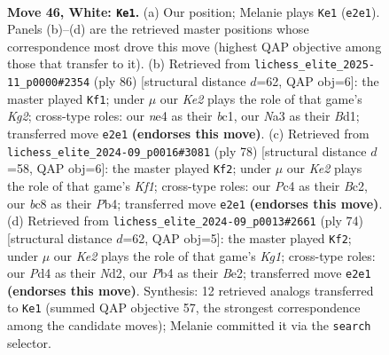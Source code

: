 \documentclass[11pt]{article}
\begin{document}
\clearpage

\begin{figure}[p]\centering
\begin{subfigure}{0.46\textwidth}\centering
\resizebox{\linewidth}{!}{%
\newchessgame
\chessboard[
  setfen={1rb5/p2p2k1/1pp5/5p1p/1PPPnP2/NB6/P3K2P/2R5 w - - 9 46},
  showmover=false,
  pgfstyle=straightmove, color=movearrow, markmove={e2-e1}
]}
\caption{}
\end{subfigure}\hfill
\begin{subfigure}{0.46\textwidth}\centering
\resizebox{\linewidth}{!}{%
\newchessgame
\chessboard[
  setfen={8/1n4k1/1P1p2p1/3Np2p/4P2P/p2p1PP1/P5K1/2bB4 w - - 2 44},
  showmover=false,
  pgfstyle=straightmove, color=movearrow, markmove={g2-f1}
]}
\caption{}
\end{subfigure}
\\[4pt]
\begin{subfigure}{0.46\textwidth}\centering
\resizebox{\linewidth}{!}{%
\newchessgame
\chessboard[
  setfen={8/6kp/1n1p4/1p1Pp3/1Pp1P1Nn/2P1P2P/2B5/5K2 w - - 0 40},
  showmover=false,
  pgfstyle=straightmove, color=movearrow, markmove={f1-f2}
]}
\caption{}
\end{subfigure}\hfill
\begin{subfigure}{0.46\textwidth}\centering
\resizebox{\linewidth}{!}{%
\newchessgame
\chessboard[
  setfen={b7/4k2p/p2pp1p1/1p2n3/4P3/P1P4P/2PNB1P1/6K1 w - - 2 38},
  showmover=false,
  pgfstyle=straightmove, color=movearrow, markmove={g1-f2}
]}
\caption{}
\end{subfigure}
\caption{\textbf{Move 46, White: \texttt{Ke1}.} (a) Our position; Melanie plays \texttt{Ke1} (\texttt{e2e1}). Panels (b)--(d) are the retrieved master positions whose correspondence most drove this move (highest QAP objective among those that transfer to it). (b) Retrieved from \texttt{lichess\_elite\_2025-11\_p0000\#2354} (ply 86) [structural distance $d$=62, QAP obj=6]: the master played \texttt{Kf1}; under $\mu$ our \emph{Ke2} plays the role of that game's \emph{Kg2}; cross-type roles: our \emph{n}e4 as their \emph{b}c1, our \emph{N}a3 as their \emph{B}d1; transferred move \texttt{e2e1} \textbf{(endorses this move)}. (c) Retrieved from \texttt{lichess\_elite\_2024-09\_p0016\#3081} (ply 78) [structural distance $d$=58, QAP obj=6]: the master played \texttt{Kf2}; under $\mu$ our \emph{Ke2} plays the role of that game's \emph{Kf1}; cross-type roles: our \emph{P}c4 as their \emph{B}c2, our \emph{b}c8 as their \emph{P}b4; transferred move \texttt{e2e1} \textbf{(endorses this move)}. (d) Retrieved from \texttt{lichess\_elite\_2024-09\_p0013\#2661} (ply 74) [structural distance $d$=62, QAP obj=5]: the master played \texttt{Kf2}; under $\mu$ our \emph{Ke2} plays the role of that game's \emph{Kg1}; cross-type roles: our \emph{P}d4 as their \emph{N}d2, our \emph{P}b4 as their \emph{B}e2; transferred move \texttt{e2e1} \textbf{(endorses this move)}. Synthesis: 12 retrieved analogs transferred to \texttt{Ke1} (summed QAP objective 57, the strongest correspondence among the candidate moves); Melanie committed it via the \texttt{search} selector.}
\label{fig:thought-m90}
\end{figure}
\end{document}
